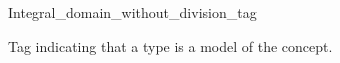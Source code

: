 \begin{ccRefClass}{Integral_domain_without_division_tag}
\label{Integral_domain_without_division_tag}

\ccDefinition
Tag indicating that a type is a model of the  concept. 

\ccIsModel
{}

\ccSeeAlso
{} \\
\end{ccRefClass} 

